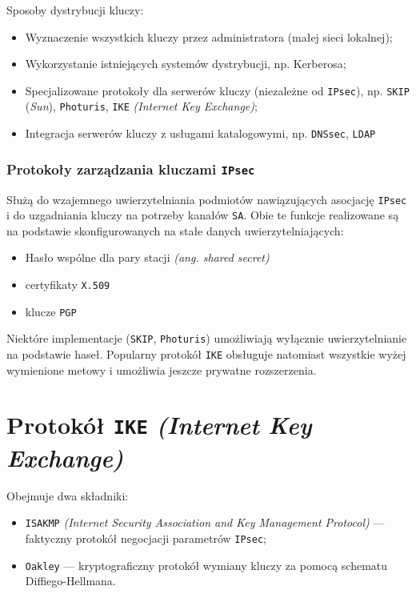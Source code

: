 \documentclass{article}
\begin{document}
Sposoby dystrybucji kluczy:
\begin{itemize}
  \item Wyznaczenie wszystkich kluczy przez administratora (małej sieci lokalnej);
  \item Wykorzystanie istniejących systemów dystrybucji, np. Kerberosa;
  \item Specjalizowane protokoły dla serwerów kluczy (niezależne od {\tt IPsec}), np. {\tt SKIP} (\emph{Sun}), {\tt Photuris}, {\tt IKE} \emph{(Internet Key Exchange)};
  \item Integracja serwerów kluczy z usługami katalogowymi, np. {\tt DNSsec}, {\tt LDAP}
\end{itemize}

\subsubsection{Protokoły zarządzania kluczami {\tt IPsec}}

Służą do wzajemnego uwierzytelniania podmiotów nawiązujących asocjację {\tt IPsec} i do uzgadniania kluczy na potrzeby kanałów {\tt SA}.
Obie te funkcje realizowane są na podstawie skonfigurowanych na stałe danych uwierzytelniających:
\begin{itemize}
  \item Hasło wspólne dla pary stacji \emph{(ang. shared secret)}
  \item certyfikaty {\tt X.509}
  \item klucze {\tt PGP}
\end{itemize}

Niektóre implementacje ({\tt SKIP}, {\tt Photuris}) umożliwiają wyłącznie uwierzytelnianie na podstawie haseł.
Popularny protokół {\tt IKE} obsługuje natomiast wszystkie wyżej wymienione metowy i umożliwia jeszcze prywatne rozszerzenia.

\section{Protokół {\tt IKE} \emph{(Internet Key Exchange)}}

Obejmuje dwa składniki:
\begin{itemize}
  \item {\tt ISAKMP} \emph{(Internet Security Association and Key Management Protocol)} --- faktyczny protokół negocjacji parametrów {\tt IPsec};
  \item {\tt Oakley} --- kryptograficzny protokół wymiany kluczy za pomocą schematu Diffiego-Hellmana.
\end{itemize}
\end{document}
